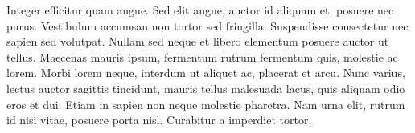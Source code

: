 Integer efficitur quam augue. Sed elit augue, auctor id aliquam et, posuere nec purus. Vestibulum accumsan non tortor
sed fringilla. Suspendisse consectetur nec sapien sed volutpat. Nullam sed neque et libero elementum posuere auctor ut
tellus. Maecenas mauris ipsum, fermentum rutrum fermentum quis, molestie ac lorem. Morbi lorem neque, interdum ut
aliquet ac, placerat et arcu. Nunc varius, lectus auctor sagittis tincidunt, mauris tellus malesuada lacus, quis aliquam
odio eros et dui. Etiam in sapien non neque molestie pharetra. Nam urna elit, rutrum id nisi vitae, posuere porta nisl.
Curabitur a imperdiet tortor.


